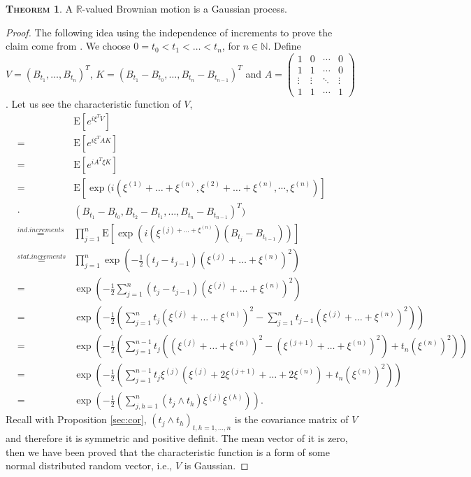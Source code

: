 \documentclass[a4paper, twoside, 11pt]{article}
\theoremstyle{definition}
\newtheorem{theorem}[definition]{\scshape Theorem}
\begin{document}
\begin{theorem}
  A $\mathbb{R}$-valued Brownian motion is a Gaussian process.
\end{theorem}
\begin{proof}
  The following idea using the independence of increments to prove the claim come from \cite{shilling}.
  We choose $0=t_0<t_1<\dots<t_n$, for $n \in \mathbb{N}$. Define
  $V = (B_{t_1},\dots,B_{t_n})^T$,  $K = (B_{t_1}-B_{t_0},\dots, B_{t_n}-B_{t_{n-1}})^T$ and 
  $A = 
  \begin{pmatrix}
	1      & 0      & \cdots & 0\\
	1      & 1      & \cdots & 0\\
	\vdots & \vdots & \ddots & \vdots \\
	1      & 1      & \cdots & 1
  \end{pmatrix}
	$.
  Let us see the characteristic function of $V$,
  \begin{eqnarray*}
	&&\mathrm{E} [e^{i\xi^T V}]\\
	&=& \mathrm{E} [e^{i\xi^T AK}]\\ 
	&=& \mathrm{E} [e^{iA^T\xi K}]\\
	&=& \mathrm{E} [\exp(i (\xi^{(1)}+\dots+\xi^{(n)}, \xi^{(2)}+\dots+\xi^{(n)}, \cdots,\xi^{(n)})] \\
	&\cdot& (B_{t_1}-B_{t_0}, B_{t_2}-B_{t_1},\dots,B_{t_n}-B_{t_{n-1}})^T)\\
	&\overset{ind.increments}{=}& \prod_{j=1}^n \mathrm{E} [\exp(i(\xi^{(j)+\dots+\xi^{(n)}})(B_{t_j}-B_{t_{t-1}}))]\\
	&\overset{stat.increments}{=}& \prod_{j=1}^n \exp(-\frac{1}{2}(t_j - t_{j-1})(\xi^{(j)}+\dots+\xi^{(n)})^2) \\
	&=& \exp\left(-\frac{1}{2}\sum_{j=1}^n (t_j - t_{j-1})(\xi^{(j)}+\dots+\xi^{(n)})^2\right)\\
    &=& \exp\left(-\frac{1}{2}\left(\sum_{j=1}^n t_j(\xi^{(j)}+\dots+\xi^{(n)})^2 - \sum_{j=1}^n t_{j-1}(\xi^{(j)}+\dots+\xi^{(n)})^2\right)\right)\\
	&=& \exp\left(-\frac{1}{2}\left(\sum_{j=1}^{n-1} t_j((\xi^{(j)}+\dots+\xi^{(n)})^2 - (\xi^{(j+1)}+\dots+\xi^{(n)})^2) + t_n(\xi^{(n)})^2\right)\right)\\
	&=& \exp\left(-\frac{1}{2}\left(\sum_{j=1}^{n-1} t_j\xi^{(j)}(\xi^{(j)}+2\xi^{(j+1)}+\dots+2\xi^{(n)}) + t_n(\xi^{(n)})^2\right)\right)\\
	&=& \exp\left(-\frac{1}{2}\left(\sum_{j,h=1}^n(t_j\wedge t_h)\xi^{(j)}\xi^{(h)}\right)\right).
  \end{eqnarray*}
  Recall with Proposition \ref{sec:cor}, $(t_j\wedge t_h)_{t,h=1,\dots,n}$ is the covariance matrix of $V$ and therefore it is symmetric and positive definit. The mean vector of it is zero, then we have been proved that the characteristic function is a form of some normal distributed random vector, i.e., $V$ is Gaussian.
\end{proof}
\end{document}
